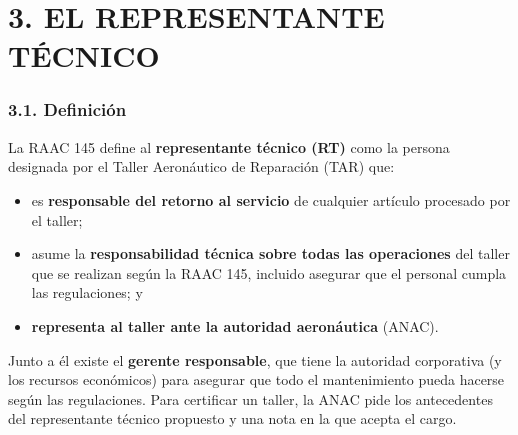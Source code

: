 \section*{3. EL REPRESENTANTE TÉCNICO}

\subsubsection*{3.1. Definición}
La RAAC 145 define al \textbf{representante técnico (RT)} como la persona designada por el Taller
Aeronáutico de Reparación (TAR) que:
\begin{itemize}
  \item es \textbf{responsable del retorno al servicio} de cualquier artículo procesado por el
        taller;
  \item asume la \textbf{responsabilidad técnica sobre todas las operaciones} del taller que se
        realizan según la RAAC 145, incluido asegurar que el personal cumpla las regulaciones; y
  \item \textbf{representa al taller ante la autoridad aeronáutica} (ANAC).
\end{itemize}
Junto a él existe el \textbf{gerente responsable}, que tiene la autoridad corporativa (y los
recursos económicos) para asegurar que todo el mantenimiento pueda hacerse según las
regulaciones. Para certificar un taller, la ANAC pide los antecedentes del representante técnico
propuesto y una nota en la que acepta el cargo.

